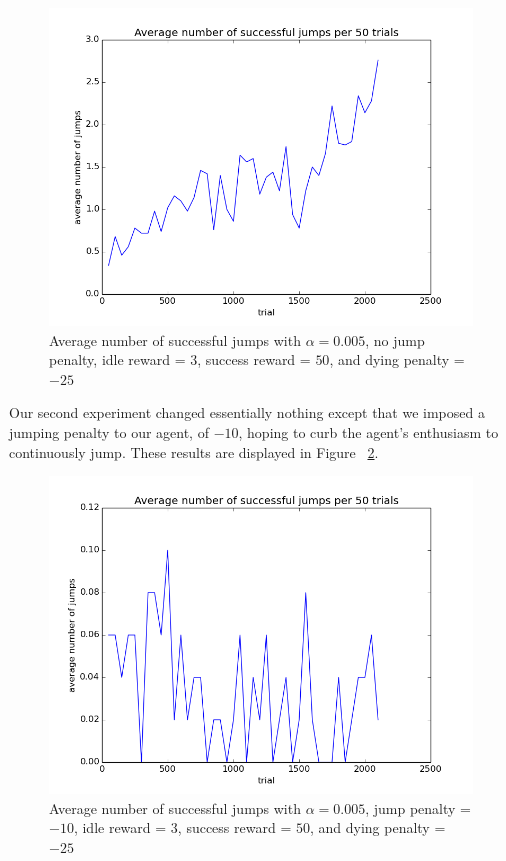 \documentclass{scrartcl}
\begin{document}
    \begin{figure}[H]
        \centering
        \includegraphics[width=\textwidth]{../avgJumps1}    
        \caption{Average number of successful jumps with $\alpha = 0.005$, no
        jump penalty, idle reward = $3$, success reward = $50$, and dying
        penalty = $-25$}
        \label{fig:exp1}
    \end{figure}

    Our second experiment changed essentially nothing except that we imposed a
    jumping penalty to our agent, of $-10$, hoping to curb the agent's
    enthusiasm to continuously jump. These results are displayed in Figure~
    \ref{fig:exp2}.

    \begin{figure}[H]
        \includegraphics[width=\textwidth]{../avgJumps2}    
        \caption{Average number of successful jumps with $\alpha = 0.005$,
        jump penalty = $-10$, idle reward = $3$, success reward = $50$, and
        dying penalty = $-25$}
        \label{fig:exp2}
    \end{figure}
\end{document}
